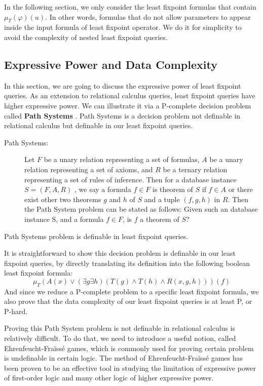 In the following section, we only consider the least fixpoint formulas that contain $\mu_T(\varphi)(u)$. In other words, formulas that do not allow parameters to appear inside the input formula of least fixpoint operator. We do it for simplicity to avoid the complexity of nested least fixpoint queries.

\subsection{Expressive Power and Data Complexity}

In this section, we are going to discuss the expressive power of least fixpoint queries. As an extension to relational calculus queries, least fixpoint queries have higher expressive power. We can illustrate it via a P-complete decision problem called \textbf{Path Systems} \cite{Cook}. Path Systems is a decision problem not definable in relational calculus but definable in our least fixpoint queries. 

\begin{description}
\item[Path Systems:]
Let $F$ be a unary relation representing a set of formulas, $A$ be a unary relation representing a set of axioms, and $R$ be a ternary relation representing a set of rules of inference. Then for a database instance $S = (F, A, R)$ , we say a formula $f\in F$ is theorem of $S$ if $f\in A$ or there exist other two theorems $g$ and $h$ of $S$ and a tuple $(f, g, h)$ in $R$. Then the Path System problem can be stated as follows: Given such an database instance S, and a formula $f\in F$, is $f$ a theorem of $S$?
\end{description}

\begin{claim}
Path Systems problem is definable in least fixpoint queries.
\end{claim}

It is straightforward to show this decision problem is definable in our least fixpoint queries, by directly translating its definition into the following boolean least fixpoint formula:
$$ \mu_T(A(x)\lor (\exists g \exists h)(T(g)\land T(h) \land R(x, g, h)))(f) $$
And since we reduce a P-complete problem to a specific least fixpoint formula, we also prove that the data complexity of our least fixpoint queries is at least P, or P-hard.

Proving this Path System problem is not definable in relational calculus is relatively difficult. To do that, we need to introduce a useful notion, called Ehrenfeucht-Fra\"iss\'e games, which is commonly used for proving certain problem is undefinable in certain logic. The method of Ehrenfeucht-Fra\"iss\'e games has been proven to be an effective tool in studying the limitation of expressive power of first-order logic and many other logic of higher expressive power.

